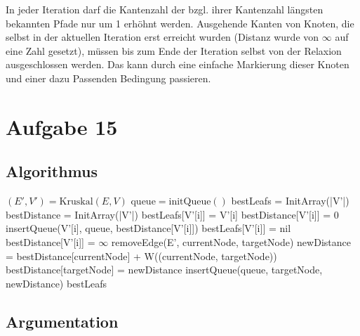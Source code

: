 \documentclass[parskip=half,a4paper]{scrartcl}
\begin{document}
In jeder Iteration darf die Kantenzahl der bzgl. ihrer Kantenzahl längsten bekannten Pfade nur um 1 erhöhnt werden. Ausgehende Kanten von Knoten, die selbst in der aktuellen Iteration erst erreicht wurden (Distanz wurde von $\infty$ auf eine Zahl gesetzt), müssen bis zum Ende der Iteration selbst von der Relaxion ausgeschlossen werden. Das kann durch eine einfache Markierung dieser Knoten und einer dazu Passenden Bedingung passieren.

\section*{Aufgabe 15}

\subsection*{Algorithmus}
\nolinenumbers
\begin{algorithmic}[1]
 
\State $(E',V') = \text{Kruskal}(E, V)$ 
\State $\text{queue} = \text{initQueue}()$
\State bestLeafs = InitArray(|V'|)
\State bestDistance = InitArray(|V'|)
 
 
\State bestLeafs[V'[i]] = V'[i]
\State bestDistance[V'[i]] = 0
\State insertQueue(V'[i], queue, bestDistance[V'[i]]) 
\Else {}
\State bestLeafs[V'[i]] = nil
\State bestDistance[V'[i]] = $\infty$
\EndIf
\EndFor
{}\label{outer}
\label{inner}
\State removeEdge(E', currentNode, targetNode)
\State newDistance = bestDistance[currentNode] + W((currentNode, targetNode))
\State bestDistance[targetNode] = newDistance
\State insertQueue(queue, targetNode, newDistance) 
 
\EndIf
\EndWhile
\EndWhile
\State \Return bestLeafs
\EndProcedure
\end{algorithmic}
\linenumbers

\subsection*{Argumentation}
\end{document}
